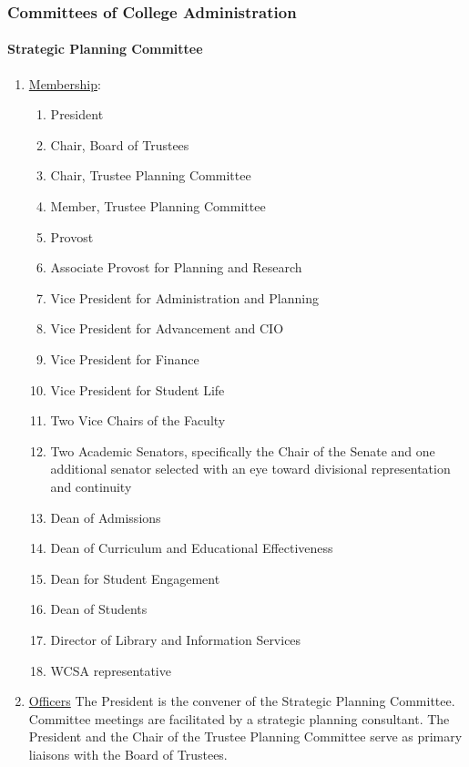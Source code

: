 		\subsubsection{Committees of College Administration}
			\paragraph{Strategic Planning Committee}
				\begin{enumerate}
					\item{\underline{Membership}:
						\begin{enumerate}
							\item{President}
							\item{Chair, Board of Trustees}
							\item{Chair, Trustee Planning Committee}
							\item{Member, Trustee Planning Committee}
							\item{Provost}
							\item{Associate Provost for Planning and Research}
							\item{Vice President for Administration and Planning}
							\item{Vice President for Advancement and CIO}
							\item{Vice President for Finance}
							\item{Vice President for Student Life}
							\item{Two Vice Chairs of the Faculty}
							\item{Two Academic Senators, specifically the Chair of the Senate and one additional senator selected with an eye toward divisional representation and continuity}
							\item{Dean of Admissions}
							\item{Dean of Curriculum and Educational Effectiveness}
							\item{Dean for Student Engagement}
							\item{Dean of Students}
							\item{Director of Library and Information Services}
							\item{WCSA representative}
						\end{enumerate}
					}
					\item{\underline{Officers}
						The President is the convener of the Strategic Planning Committee.  Committee meetings are facilitated by a strategic planning consultant.  The President and the Chair of the Trustee Planning Committee serve as primary liaisons with the Board of Trustees.}

\end{enumerate}

